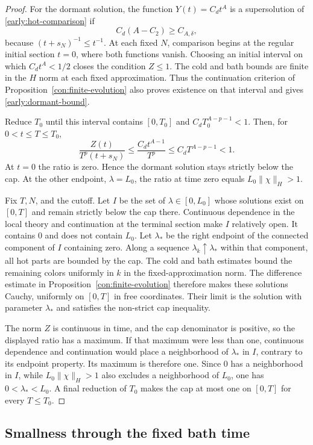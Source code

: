 \begin{proof}
For the dormant solution, the function $Y(t)=C_dt^A$ is a supersolution
of \eqref{early:hot-comparison} if
\[
 C_d(A-C_2)\ge C_{A,\delta},
\]
because $(t+s_N)^{-1}\le t^{-1}$. At each fixed $N$, comparison begins
at the regular initial section $t=0$, where both functions vanish.
Choosing an initial interval on which $C_dt^A<1/2$ closes the condition
$Z\le1$. The cold and bath bounds are finite in the $H$ norm at each
fixed approximation. Thus the continuation criterion of
Proposition~\ref{con:finite-evolution} also proves existence on that
interval and gives \eqref{early:dormant-bound}.

Reduce $T_0$ until this interval contains $[0,T_0]$ and
$C_dT_0^{A-p-1}<1$. Then, for $0<t\le T\le T_0$,
\[
 \frac{Z(t)}{T^p(t+s_N)}
 \le\frac{C_dt^{A-1}}{T^p}
 \le C_dT^{A-p-1}<1.
\]
At $t=0$ the ratio is zero. Hence the dormant solution stays strictly
below the cap. At the other endpoint, $\lambda=L_0$, the ratio at time
zero equals $L_0\|\chi\|_H>1$.

Fix $T,N$, and the cutoff. Let $I$ be the set of
$\lambda\in[0,L_0]$ whose solutions exist on $[0,T]$ and remain strictly
below the cap there. Continuous dependence in the local theory and
continuation at the terminal section make $I$ relatively open.
It contains $0$ and does not contain $L_0$. Let $\lambda_*$ be the
right endpoint of the connected component of $I$ containing zero.
Along a sequence $\lambda_k\uparrow\lambda_*$ within that component,
all hot parts are bounded by the cap. The cold and bath estimates bound
the remaining colors uniformly in $k$ in the fixed-approximation norm.
The difference estimate in Proposition~\ref{con:finite-evolution}
therefore makes these solutions Cauchy, uniformly on $[0,T]$ in free
coordinates. Their limit is the solution with parameter $\lambda_*$
and satisfies the non-strict cap inequality.

The norm $Z$ is continuous in time, and the cap denominator is positive,
so the displayed ratio has a maximum. If that maximum were less than
one, continuous dependence and continuation would place a neighborhood
of $\lambda_*$ in $I$, contrary to its endpoint property. Its maximum
is therefore one. Since $0$ has a neighborhood in $I$, while
$L_0\|\chi\|_H>1$ also excludes a neighborhood of $L_0$, one has
$0<\lambda_*<L_0$. A final reduction of $T_0$ makes the cap at most one
on $[0,T]$ for every $T\le T_0$.
\end{proof}

\subsection{Smallness through the fixed bath time}

